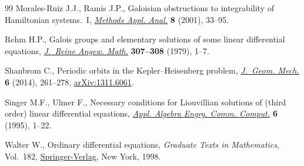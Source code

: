 \documentclass[pdftex]{sigma}
\numberwithin{equation}{section}
\begin{document}
\begin{thebibliography}{99}
Morales-Ruiz J.J., Ramis J.P., Galoisian obstructions to integrability of
 {H}amiltonian systems.~{I}, \href{https://doi.org/10.4310/MAA.2001.v8.n1.a3}{\textit{Methods Appl. Anal.}} \textbf{8} (2001),
 33--95.

Rehm H.P., Galois groups and elementary solutions of some linear differential
 equations, \href{https://doi.org/10.1515/crll.1979.307-308.1}{\textit{J.~Reine Angew. Math.}} \textbf{307--308} (1979), 1--7.

Shanbrom C., Periodic orbits in the {K}epler--{H}eisenberg problem,
 \href{https://doi.org/10.3934/jgm.2014.6.261}{\textit{J.~Geom. Mech.}} \textbf{6} (2014), 261--278, \href{https://arxiv.org/abs/1311.6061}{arXiv:1311.6061}.

Singer M.F., Ulmer F., Necessary conditions for {L}iouvillian solutions of
 (third order) linear differential equations, \href{https://doi.org/10.1007/BF01270928}{\textit{Appl. Algebra Engrg.
 Comm. Comput.}} \textbf{6} (1995), 1--22.

Walter W., Ordinary differential equations, \textit{Graduate Texts in
 Mathematics}, Vol.~182, \href{https://doi.org/10.1007/978-1-4612-0601-9}{Springer-Verlag}, New York, 1998.

\end{thebibliography}\LastPageEnding
\end{document}
